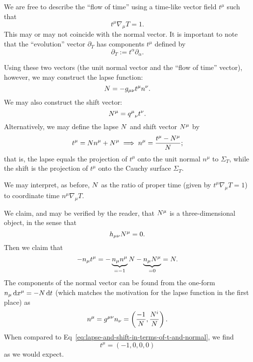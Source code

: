 We are free to describe the ``flow of time''
using a time-like vector field $t^{\mu}$ such that
\begin{equation}
t^{\mu}\nabla_{\mu}T=1.
\end{equation}
This may or may not coincide with the normal vector. It is important to
note that the ``evolution'' vector $\partial_{T}$ has components $t^{\mu}$ 
defined by
\begin{equation}
  \partial_{T} := t^{\alpha}\partial_{\alpha}.
\end{equation}

Using these two vectors (the unit normal vector and the ``flow of time''
vector), however, we may construct the lapse function:
\begin{equation}
N = -g_{\mu\nu}t^{\mu}n^{\nu}.
\end{equation}
We may also construct the shift vector:
\begin{equation}
N^{\mu}  = {q^{\mu}}_{\nu}t^{\nu}.
\end{equation}
Alternatively, we may define the lapse $N$ and shift vector
$N^{\mu}$ by
\begin{equation}\label{eq:lapse-and-shift-in-terms-of-t-and-normal}
t^{\mu} = N n^{\mu} + N^{\mu} \implies n^{\mu} = \frac{t^{\mu}-N^{\mu}}{N};
\end{equation}
that is, the lapse equals the projection of $t^{\mu}$ onto the unit
normal $n^{\mu}$ to $\Sigma_{T}$, while the shift is the projection of
$t^{\mu}$ onto the Cauchy surface $\Sigma_{T}$.

We may interpret, as before, $N$ as the ratio of proper time (given
by $t^{\mu}\nabla_{\mu} T=1$) to coordinate time $n^{\mu}\nabla_{\mu}T$.

We claim, and may be verified by the reader, that $N^{\mu}$ is a
three-dimensional object, in the sense that
\begin{equation}
h_{\mu\nu}N^{\mu} = 0.
\end{equation}
Then we claim that
\begin{equation}
-n_{\mu}t^{\mu} = -\underbrace{n_{\mu}n^{\mu}}_{=-1}N - \underbrace{n_{\mu}N^{\mu}}_{=0}
= N.
\end{equation}
The components of the normal vector can be found from the one-form
$n_{\mu}\,\mathrm{d} x^{\mu}=-N\,\mathrm{d} t$ (which matches the motivation for the
lapse function in the first place) as
\begin{equation}\label{eq;cauchy-surface:normal-vector-in-obvious-time-slicing}
n^{\mu} = g^{\mu\nu}n_{\nu} = \left(\frac{-1}{N},\frac{N^{i}}{N}\right).
\end{equation}
When compared to Eq~\eqref{eq:lapse-and-shift-in-terms-of-t-and-normal},
we find
\begin{equation}
t^{\mu} = (-1, 0, 0, 0)
\end{equation}
as we would expect.